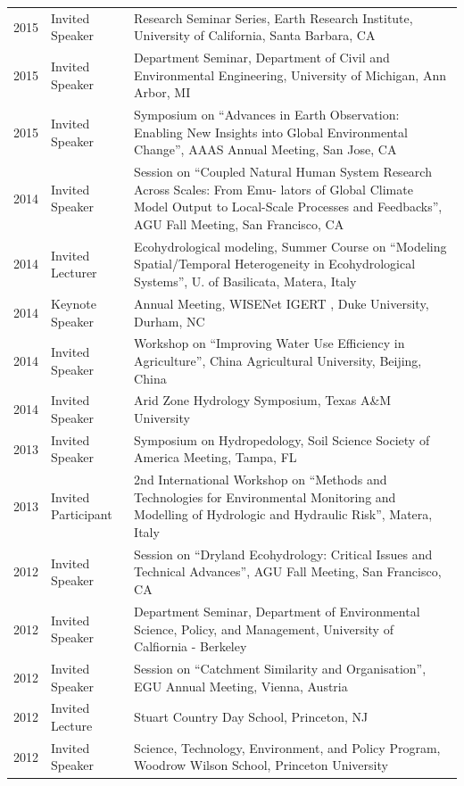 \begin{longtable}{l p{3.0cm} p{11.5cm}}
2015 & Invited Speaker & Research Seminar Series, Earth Research Institute, University of California, Santa Barbara, CA \\
2015 & Invited Speaker & Department Seminar, Department of Civil and Environmental Engineering, University of Michigan, Ann Arbor, MI \\
2015 & Invited Speaker & Symposium on ``Advances in Earth Observation: Enabling New Insights into Global Environmental Change'', AAAS Annual Meeting, San Jose, CA \\
2014 & Invited Speaker & Session on ``Coupled Natural Human System Research Across Scales: From Emu- lators of Global Climate Model Output to Local-Scale Processes and Feedbacks'', AGU Fall Meeting, San Francisco, CA  \\
2014 & Invited Lecturer & Ecohydrological modeling, Summer Course on ``Modeling Spatial/Temporal Heterogeneity in Ecohydrological Systems'', U. of Basilicata, Matera, Italy \\
2014 & Keynote Speaker & Annual Meeting, WISENet IGERT , Duke University, Durham, NC \\
2014 & Invited Speaker & Workshop on ``Improving Water Use Efficiency in Agriculture'', China Agricultural University, Beijing, China \\
2014 & Invited Speaker & Arid Zone Hydrology Symposium, Texas A\&M University \\
2013 & Invited Speaker & Symposium on Hydropedology, Soil Science Society of America Meeting, Tampa, FL \\
2013 & Invited Participant & 2nd International Workshop on ``Methods and Technologies for Environmental Monitoring and Modelling of Hydrologic and Hydraulic Risk'', Matera, Italy \\
2012 & Invited Speaker & Session on ``Dryland Ecohydrology: Critical Issues and Technical Advances'', AGU Fall Meeting, San Francisco, CA \\
2012 & Invited Speaker & Department Seminar, Department of Environmental Science, Policy, and Management, University of Calfiornia - Berkeley \\
2012 & Invited Speaker & Session on ``Catchment Similarity and Organisation'', EGU Annual Meeting, Vienna, Austria \\
2012 & Invited Lecture & Stuart Country Day School, Princeton, NJ \\
2012 & Invited Speaker & Science, Technology, Environment, and Policy Program, Woodrow Wilson School, Princeton University \\

\end{longtable}
